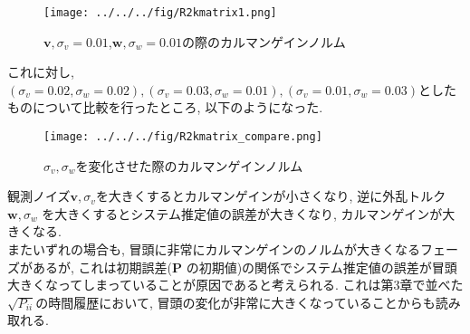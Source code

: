 \documentclass[class=article, crop=false, dvipdfmx, fleqn]{standalone}
\begin{document}
\begin{figure}[H]
  \begin{center}
  \texttt{[image: ../../../fig/R2kmatrix1.png]}
  \caption{$\bm{v}, \sigma_v = 0.01$,$\bm{w}, \sigma_w = 0.01$の際のカルマンゲインノルム}
\end{center}
\end{figure}

これに対し, $(\sigma_v = 0.02, \sigma_w = 0.02), (\sigma_v = 0.03, \sigma_w = 0.01),
(\sigma_v = 0.01, \sigma_w = 0.03)$としたものについて比較を行ったところ,
以下のようになった.
\begin{figure}[H]
  \begin{center}
  \texttt{[image: ../../../fig/R2kmatrix\_compare.png]}
  \caption{$\sigma_v,\sigma_w$を変化させた際のカルマンゲインノルム}
\end{center}
\end{figure}

観測ノイズ$\bm{v}, \sigma_v$を大きくするとカルマンゲインが小さくなり, 逆に外乱トルク$\bm{w}, \sigma_w$
を大きくするとシステム推定値の誤差が大きくなり, カルマンゲインが大きくなる. \\
またいずれの場合も, 冒頭に非常にカルマンゲインのノルムが大きくなるフェーズがあるが, これは初期誤差($\bm{P}$
の初期値)の関係でシステム推定値の誤差が冒頭大きくなってしまっていることが原因であると考えられる.
これは第3章で並べた$\sqrt{P_{ii}}$の時間履歴において, 冒頭の変化が非常に大きくなっていることからも読み取れる.
\end{document}
